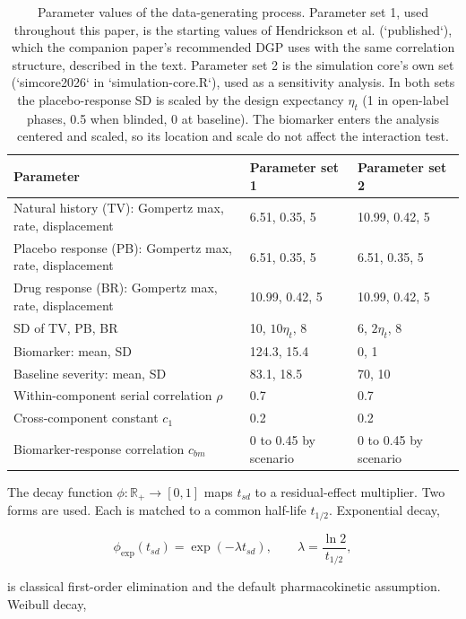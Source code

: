 \documentclass[
  11pt,
]{article}
\begin{document}
\begin{table}
\centering
\caption{\label{tab:tab-params}Parameter values of the data-generating process.
    Parameter set 1, used throughout this paper, is the starting
    values of Hendrickson et al. (`published`), which the companion
    paper's recommended DGP uses with the same correlation structure,
    described in the text. Parameter set 2 is the simulation core's
    own set (`simcore2026` in `simulation-core.R`), used as a
    sensitivity analysis. In both sets the
    placebo-response SD is scaled by the design expectancy $\eta_t$
    (1 in open-label phases, 0.5 when blinded, 0 at baseline). The
    biomarker enters the analysis centered and scaled, so its
    location and scale do not affect the interaction test.}
\centering
\fontsize{8}{10}\selectfont
\begin{tabular}[t]{>{\raggedright\arraybackslash}p{7cm}ll}
\toprule
Parameter & Parameter set 1 & Parameter set 2\\
\midrule
Natural history (TV): Gompertz max, rate, displacement & 6.51, 0.35, 5 & 10.99, 0.42, 5\\
Placebo response (PB): Gompertz max, rate, displacement & 6.51, 0.35, 5 & 6.51, 0.35, 5\\
Drug response (BR): Gompertz max, rate, displacement & 10.99, 0.42, 5 & 10.99, 0.42, 5\\
SD of TV, PB, BR & 10, $10\eta_t$, 8 & 6, $2\eta_t$, 8\\
Biomarker: mean, SD & 124.3, 15.4 & 0, 1\\
Baseline severity: mean, SD & 83.1, 18.5 & 70, 10\\
Within-component serial correlation $\rho$ & 0.7 & 0.7\\
Cross-component constant $c_1$ & 0.2 & 0.2\\
Biomarker-response correlation $c_{bm}$ & 0 to 0.45 by scenario & 0 to 0.45 by scenario\\
\bottomrule
\end{tabular}
\end{table}

The decay function \(\phi : \mathbb{R}_+ \to [0, 1]\) maps \(t_{sd}\) to
a residual-effect multiplier. Two forms are used. Each is matched to
a common half-life \(t_{1/2}\). Exponential decay,

\[\phi_{\text{exp}}(t_{sd}) =
  \exp\left(-\lambda t_{sd}\right), \qquad
  \lambda = \frac{\ln 2}{t_{1/2}},\]

is classical first-order elimination and the default pharmacokinetic
assumption. Weibull decay,
\end{document}
